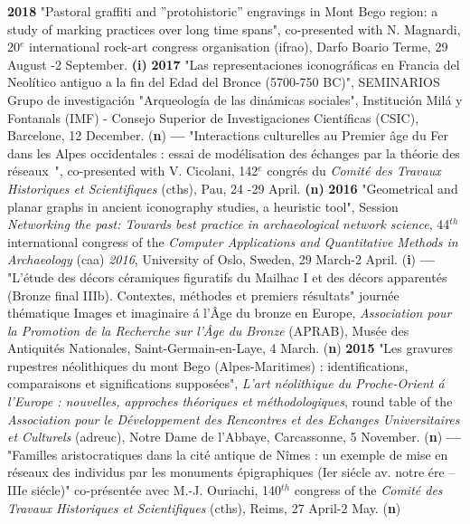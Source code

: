 \documentclass[11pt]{report} %
\begin{document}
\smallbreak
\textbf{2018 }"Pastoral graffiti and ''protohistoric'' engravings in Mont Bego region: a study of marking practices over long time spans", co-presented with N. Magnardi, 20${}^{e}$ international rock-art congress organisation (ifrao), Darfo Boario Terme, 29 August -2 September.\textbf{ (i)}
\smallbreak
\textbf{2017 }"Las representaciones iconogr\'{a}ficas en Francia del Neol\'{i}tico antiguo a la fin del Edad del Bronce (5700-750 BC)", SEMINARIOS Grupo de investigaci\'{o}n "Arqueolog\'{i}a de las din\'{a}micas sociales", Instituci\'{o}n Mil\'{a} y Fontanals (IMF) - Consejo Superior de Investigaciones Cient\'{i}ficas (CSIC), Barcelone, 12 December. (\textbf{n})
\smallbreak
\textbf{---  } "Interactions culturelles au Premier \^{a}ge du Fer dans les Alpes occidentales : essai de mod\'{e}lisation des \'{e}changes par la th\'{e}orie des r\'{e}seaux~", co-presented with V. Cicolani, 142${}^{e}$ congr\'{e}s du \textit{Comit\'{e} des Travaux Historiques et Scientifiques} (cths), Pau, 24 -29 April.\textbf{ (n)}
\smallbreak
\textbf{2016 }"Geometrical and planar graphs in ancient iconography studies, a heuristic tool", Session \textit{Networking the past: Towards best practice in archaeological network science}, 44${}^{th}$ international congress of the \textit{Computer Applications and Quantitative Methods in Archaeology }(caa) \textit{2016}, University of Oslo, Sweden, 29 March-2 April. (\textbf{i})\textbf{}
\smallbreak
\textbf{---  }"L'\'{e}tude des d\'{e}cors c\'{e}ramiques figuratifs du Mailhac I et des d\'{e}cors apparent\'{e}s (Bronze final IIIb). Contextes, m\'{e}thodes et premiers r\'{e}sultats" journ\'{e}e th\'{e}matique Images et imaginaire \'{a} l'\^{A}ge du bronze en Europe, \textit{Association pour la Promotion de la Recherche sur l'\^{A}ge du Bronze} (APRAB), Mus\'{e}e des Antiquit\'{e}s Nationales, Saint-Germain-en-Laye, 4 March. (\textbf{n})
\smallbreak
\textbf{2015 }"Les gravures rupestres n\'{e}olithiques du mont Bego (Alpes-Maritimes) : identifications, comparaisons et significations suppos\'{e}es", \textit{L'art n\'{e}olithique du Proche-Orient \'{a} l'Europe : nouvelles, approches th\'{e}oriques et m\'{e}thodologiques}, round table of the \textit{Association pour le D\'{e}veloppement des Rencontres et des Echanges Universitaires et Culturels} (adreuc), Notre Dame de l'Abbaye, Carcassonne, 5 November. (\textbf{n})
\smallbreak
\textbf{---  }"Familles aristocratiques dans la cit\'{e} antique de N\^{i}mes : un exemple de mise en r\'{e}seaux des individus par les monuments \'{e}pigraphiques (Ier si\'{e}cle av. notre \'{e}re -- IIIe si\'{e}cle)" co-pr\'{e}sent\'{e}e avec M.-J. Ouriachi, 140${}^{th}$ congress of the \textit{Comit\'{e} des Travaux Historiques et Scientifiques} (cths), Reims, 27 April-2 May. (\textbf{n})
\end{document}
